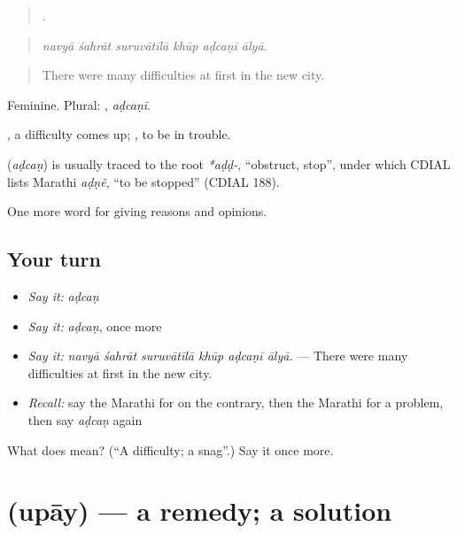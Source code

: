 \begin{quote}
     .
\end{quote}

\begin{quote}
\emph{navyā śahrāt suruvātīlā khūp aḍcaṇī ālyā.}
\end{quote}

\begin{quote}
There were many difficulties at first in the new city.
\end{quote}

Feminine. Plural: , \emph{aḍcaṇī}.

 , a difficulty comes up;  , to be in trouble.

\begin{cousinweb}
\textbf{} (\emph{aḍcaṇ}) is usually traced to the root \emph{*aḍḍ-}, \textquotedblleft{}obstruct, stop\textquotedblright{}, under which CDIAL lists Marathi \emph{aḍṇẽ}, \textquotedblleft{}to be stopped\textquotedblright{} (CDIAL 188).
\end{cousinweb}

\begin{grammarlens}[title={What you've built}]
One more word for giving reasons and opinions.
\end{grammarlens}

\subsection*{Your turn}
\begin{itemize}
\raggedright
  \item \emph{Say it:} \emph{aḍcaṇ}
  \item \emph{Say it:} \emph{aḍcaṇ}, once more
  \item \emph{Say it:} \emph{navyā śahrāt suruvātīlā khūp aḍcaṇī ālyā.} — There were many difficulties at first in the new city.
  \item \emph{Recall:} say the Marathi for on the contrary, then the Marathi for a problem, then say \emph{aḍcaṇ} again
\end{itemize}

\begin{tcolorbox}[breakable,colback=teal!4,colframe=teal!35!black,title={Before you move on}]
What does  mean? (\textquotedblleft{}A difficulty; a snag\textquotedblright{}.) Say it once more.
\end{tcolorbox}
\section[\texorpdfstring{\mr{उपाय} (upāy)}{उपाय (upāy)}]{ (upāy) — a remedy; a solution}

